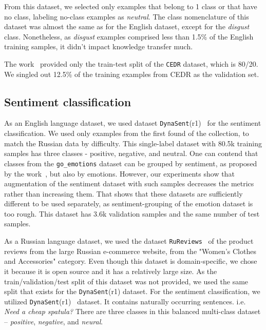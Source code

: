 From this dataset, we selected only examples that belong to 1 class or that have no class, labeling no-class examples as \textit{neutral}. The class nomenclature of this dataset was almost the same as for the English dataset, except for the \textit{disgust} class. Nonetheless, as \textit{disgust} examples comprised less than 1.5\% of the English training samples, it didn't impact knowledge transfer much.

The work~\cite{ru_emotions} provided only the train-test split of the \texttt{CEDR} dataset, which is 80/20. We singled out 12.5\% of the training examples from CEDR as the validation set. 

\subsection{Sentiment classification}

As an English language dataset, we used dataset \texttt{DynaSent}(r1)~\cite{sentiment} for the sentiment classification. We used only examples from the first found of the collection, to match the Russian data by difficulty. This single-label dataset with 80.5k training samples has three classes - positive, negative, and neutral. One can contend that classes from the \texttt{go\_emotions} dataset can be grouped by sentiment, as proposed by the work~\cite{emotions}, but also by emotions. However, our experiments show that augmentation of the sentiment dataset with such samples decreases the metrics rather than increasing them. That shows that these datasets are sufficiently different to be used separately, as sentiment-grouping of the emotion dataset is too rough. This dataset has 3.6k validation samples and the same number of test samples. 

As a Russian language dataset, we used the dataset \texttt{RuReviews}~\cite{ru_sentiment} of the product reviews from the large Russian e-commerce website, from the "Women’s Clothes and Accessories" category. Even though this dataset is domain-specific, we chose it because it is open source and it has a relatively large size. As the train/validation/test split of this dataset was not provided, we used the same split that exists for the \texttt{DynaSent}(r1) dataset. 
For the sentiment classification, we utilized \texttt{DynaSent}(r1)~\cite{sentiment} dataset. It contains naturally occurring sentences. i.e. \textit{Need a cheap spatula?} There are three classes in this balanced multi-class dataset -- \textit{positive},  \textit{negative}, and \textit{neural}. %



